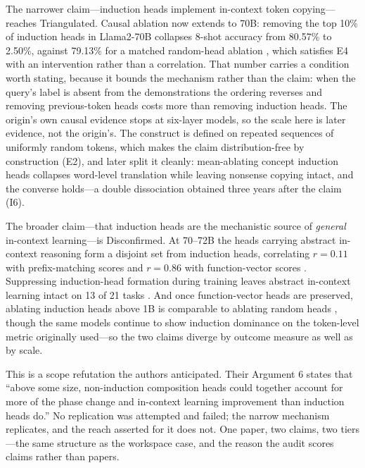 \documentclass{article}
\begin{document}
The narrower claim---induction heads implement in-context token copying---reaches Triangulated. Causal ablation now extends to 70B: removing the top 10\% of induction heads in Llama2-70B collapses 8-shot accuracy from 80.57\% to 2.50\%, against 79.13\% for a matched random-head ablation \citep{yang2025unifying}, which satisfies E4 with an intervention rather than a correlation. That number carries a condition worth stating, because it bounds the mechanism rather than the claim: when the query's label is absent from the demonstrations the ordering reverses and removing previous-token heads costs more than removing induction heads. The origin's own causal evidence stops at six-layer models, so the scale here is later evidence, not the origin's. The construct is defined on repeated sequences of uniformly random tokens, which makes the claim distribution-free by construction (E2), and \citet{feucht2025dual} later split it cleanly: mean-ablating concept induction heads collapses word-level translation while leaving nonsense copying intact, and the converse holds---a double dissociation obtained three years after the claim (I6).

The broader claim---that induction heads are the mechanistic source of \emph{general} in-context learning---is Disconfirmed. At 70--72B the heads carrying abstract in-context reasoning form a disjoint set from induction heads, correlating $r=0.11$ with prefix-matching scores and $r=0.86$ with function-vector scores \citep{webb2025emergent}. Suppressing induction-head formation during training leaves abstract in-context learning intact on 13 of 21 tasks \citep{sahin2025incontext}. And once function-vector heads are preserved, ablating induction heads above 1B is comparable to ablating random heads \citep{yin2025which}, though the same models continue to show induction dominance on the token-level metric \citet{olsson2022context} originally used---so the two claims diverge by outcome measure as well as by scale.

This is a scope refutation the authors anticipated. Their Argument 6 states that ``above some size, non-induction composition heads could together account for more of the phase change and in-context learning improvement than induction heads do.'' No replication was attempted and failed; the narrow mechanism replicates, and the reach asserted for it does not. One paper, two claims, two tiers---the same structure as the workspace case, and the reason the audit scores claims rather than papers.
\end{document}
